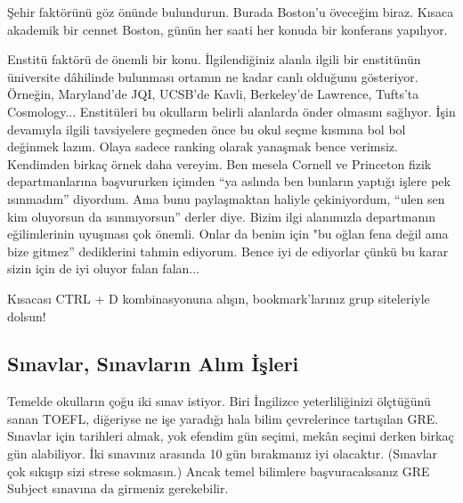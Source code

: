 \documentclass[12pt]{article}
\begin{document}
Şehir faktörünü göz önünde bulundurun. Burada Boston’u öveceğim biraz. Kısaca akademik bir cennet Boston, günün her saati her konuda bir konferans yapılıyor.

Enstitü faktörü de önemli bir konu. İlgilendiğiniz alanla ilgili bir enstitünün üniversite dâhilinde bulunması ortamın ne kadar canlı olduğunu gösteriyor. Örneğin, Maryland’de JQI, UCSB’de Kavli, Berkeley’de Lawrence, Tufts’ta Cosmology... Enstitüleri bu okulların belirli alanlarda önder olmasını sağlıyor. İşin devamıyla ilgili tavsiyelere geçmeden önce bu okul seçme kısmına bol bol değinmek lazım. Olaya sadece ranking olarak yanaşmak bence verimsiz. Kendimden birkaç örnek daha vereyim. Ben mesela Cornell ve Princeton fizik departmanlarına başvururken içimden “ya aslında ben bunların yaptığı işlere pek ısınmadım” diyordum. Ama bunu paylaşmaktan haliyle çekiniyordum, “ulen sen kim oluyorsun da ısınmıyorsun” derler diye. Bizim ilgi alanımızla departmanın eğilimlerinin uyuşması çok önemli. Onlar da benim için "bu oğlan fena değil ama bize gitmez” dediklerini tahmin ediyorum. Bence iyi de ediyorlar çünkü bu karar sizin için de iyi oluyor falan falan...

Kısacası CTRL + D kombinasyonuna alışın, bookmark’larınız grup siteleriyle dolsun!

\subsection{Sınavlar, Sınavların Alım İşleri}
Temelde okulların çoğu iki sınav istiyor. Biri İngilizce yeterliliğinizi ölçtüğünü sanan TOEFL, diğeriyse ne işe yaradığı hala bilim çevrelerince tartışılan GRE. Sınavlar için tarihleri almak, yok efendim gün seçimi, mekân seçimi derken birkaç gün alabiliyor. İki sınavınız arasında 10 gün bırakmanız iyi olacaktır. (Sınavlar çok sıkışıp sizi strese sokmasın.) Ancak temel bilimlere başvuracaksanız GRE Subject sınavına da girmeniz gerekebilir.
\end{document}

